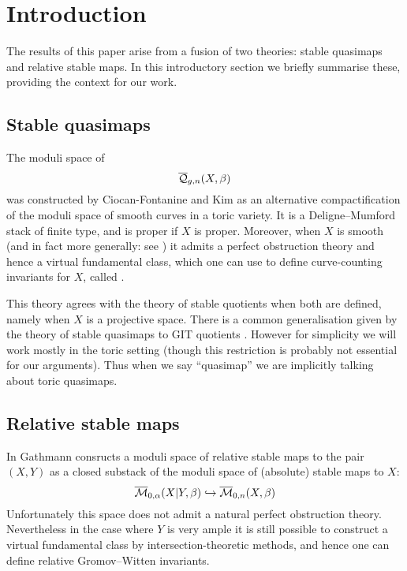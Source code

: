 \section{Introduction}
The results of this paper arise from a fusion of two theories: stable quasimaps and relative stable maps. In this introductory section we briefly summarise these, providing the context for our work.

\subsection{Stable quasimaps}
The moduli space of 
\begin{equation*} \overline{\mathcal Q}_{g,n}(X,\beta) \end{equation*}
was constructed by Ciocan-Fontanine and Kim \cite{CF-K} as an alternative compactification of the moduli space of smooth curves in a toric variety. It is a Deligne--Mumford stack of finite type, and is proper if $X$ is proper. Moreover, when $X$ is smooth (and in fact more generally: see \cite[\S 4.5]{CFKM}) it admits a perfect obstruction theory and hence a virtual fundamental class, which one can use to define curve-counting invariants for $X$, called .

This theory agrees with the theory of stable quotients \cite{MOP} when both are defined, namely when $X$ is a projective space.  There is a common generalisation given by the theory of stable quasimaps to GIT quotients \cite{CFKM}. However for simplicity we will work mostly in the toric setting (though this restriction is probably not essential for our arguments). Thus when we say ``quasimap'' we are implicitly talking about toric quasimaps.

\subsection{Relative stable maps}
In \cite{Ga} Gathmann consructs a moduli space of relative stable maps to the pair $(X,Y)$ as a closed substack of the moduli space of (absolute) stable maps to $X$:
\begin{equation*} \overline{\mathcal M}_{0,\alpha}(X|Y,\beta) \hookrightarrow \overline{\mathcal M}_{0,n}(X,\beta) \end{equation*}
Unfortunately this space does not admit a natural perfect obstruction theory. Nevertheless in the case where $Y$ is very ample it is still possible to construct a virtual fundamental class by intersection-theoretic methods, and hence one can define relative Gromov--Witten invariants.

